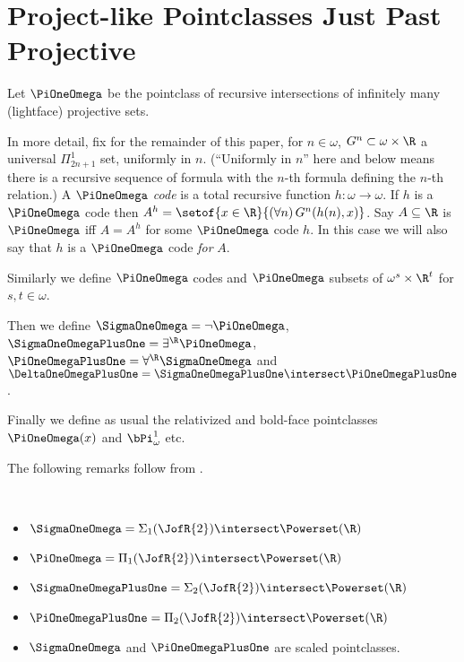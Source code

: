 \documentclass[oneside,12pt]{amsart}
\begin{document}
\section{Project-like Pointclasses Just Past Projective}
\label{section:projectlikepointclasses}

\begin{definition}
Let $\PiOneOmega$ be the pointclass of recursive intersections of infinitely many (lightface) projective sets.

In more detail, fix for the remainder of this paper, for $n\in\omega$, $G^n\subset\omega\times\R$
a universal $\Pi^1_{2n+1}$ set, uniformly in $n$. (``Uniformly in $n$'' here and below
means there is a recursive sequence of formula with the $n$-th formula defining the $n$-th relation.)
A $\PiOneOmega$ \emph{code} is a total recursive function $h:\omega\to\omega$. If $h$ is a $\PiOneOmega$ code then
$A^h=\setof{x\in\R}{(\forall n)\, G^n(h(n),x)}$. Say $A\subseteq\R$ is $\PiOneOmega$ iff
$A=A^h$ for some $\PiOneOmega$ code $h$. In this case we will also say that $h$
is a $\PiOneOmega$ code \emph{for} $A$.

Similarly we define $\PiOneOmega$ codes and $\PiOneOmega$ subsets of $\omega^s\times \R^t$ for $s,t\in\omega$.

Then we define $\SigmaOneOmega = \neg\PiOneOmega$, $\SigmaOneOmegaPlusOne=\exists^{\R}\PiOneOmega$,
$\PiOneOmegaPlusOne = \forall^{\R}\SigmaOneOmega$ and
$\DeltaOneOmegaPlusOne = \SigmaOneOmegaPlusOne \intersect \PiOneOmegaPlusOne$.

Finally we define as usual the relativized and bold-face
pointclasses $\PiOneOmega(x)$
and $\bPi^1_{\omega}$ etc.
\end{definition}

The following remarks follow from \cite{Scales_In_LofR}.
\begin{remarks} \
\begin{itemize}
\item $\SigmaOneOmega = \Sigma_1(\JofR{2}) \intersect \Powerset(\R)$
\item $\PiOneOmega = \Pi_1(\JofR{2}) \intersect \Powerset(\R)$
\item $\SigmaOneOmegaPlusOne = \Sigma_2(\JofR{2}) \intersect \Powerset(\R)$
\item $\PiOneOmegaPlusOne = \Pi_2(\JofR{2}) \intersect \Powerset(\R)$
\item $\SigmaOneOmega$ and $\PiOneOmegaPlusOne$
are scaled pointclasses.
\end{itemize}
\end{remarks}
\end{document}
